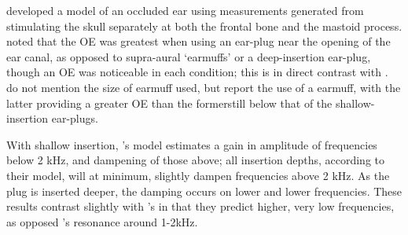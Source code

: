 \cite{stenfelt:07} developed a model of an occluded ear using measurements generated from stimulating the skull separately at both the frontal bone and the mastoid process.
%
\DIFdelbegin %
{%
}
\DIFdelend %
%
\DIFdelbegin {}\DIFdelend \DIFaddbegin {}\DIFaddend noted that the OE was greatest when using an ear-plug near the opening of the ear canal, as opposed to supra-aural `earmuffs' or a deep-insertion ear-plug, though an OE was noticeable in each condition; this is in direct contrast with \cite{dean:00}\DIFaddbegin {}\DIFaddend .  \cite{dean:00} do not mention the size of earmuff used, but \cite{stenfelt:07} report the use of a \DIFdelbegin {}\DIFdelend \DIFaddbegin {}\DIFaddend earmuff, with the latter providing a greater OE than the former\DIFdelbegin {}\DIFdelend \DIFaddbegin {}\DIFaddend still below that of the shallow-insertion ear-plugs.

With shallow insertion, \cite{stenfelt:07}'s model estimates a gain in amplitude of frequencies below 2 kHz, and dampening of those above; all insertion depths, according to their model, will at minimum, slightly dampen frequencies above 2 kHz.  As the plug is inserted deeper, the damping occurs on lower and lower frequencies. These results contrast slightly with \cite{bekesy:60}'s\DIFdelbegin {}\DIFdelend %
in that they predict higher, very low frequencies, as opposed \DIFdelbegin {}\DIFdelend \DIFaddbegin {}\DIFaddend \cite{bekesy:60}'s\DIFdelbegin {}\DIFdelend %
resonance around 1-2kHz.

